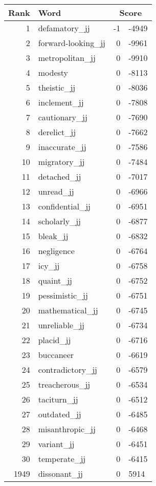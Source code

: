 \begin{longtable}[!htbp]{| rlr@{.}l |}
    \hline
    \textbf{Rank} & \textbf{Word} & \multicolumn{2}{c|}{\textbf{Score}} \\
    \hline
    \endhead
    1 & defamatory\_jj & -1 & -4949 \\
    2 & forward-looking\_jj & 0 & -9961 \\
    3 & metropolitan\_jj & 0 & -9910 \\
    4 & modesty & 0 & -8113 \\
    5 & theistic\_jj & 0 & -8036 \\
    6 & inclement\_jj & 0 & -7808 \\
    7 & cautionary\_jj & 0 & -7690 \\
    8 & derelict\_jj & 0 & -7662 \\
    9 & inaccurate\_jj & 0 & -7586 \\
    10 & migratory\_jj & 0 & -7484 \\
    11 & detached\_jj & 0 & -7017 \\
    12 & unread\_jj & 0 & -6966 \\
    13 & confidential\_jj & 0 & -6951 \\
    14 & scholarly\_jj & 0 & -6877 \\
    15 & bleak\_jj & 0 & -6832 \\
    16 & negligence & 0 & -6764 \\
    17 & icy\_jj & 0 & -6758 \\
    18 & quaint\_jj & 0 & -6752 \\
    19 & pessimistic\_jj & 0 & -6751 \\
    20 & mathematical\_jj & 0 & -6745 \\
    21 & unreliable\_jj & 0 & -6734 \\
    22 & placid\_jj & 0 & -6716 \\
    23 & buccaneer & 0 & -6619 \\
    24 & contradictory\_jj & 0 & -6579 \\
    25 & treacherous\_jj & 0 & -6534 \\
    26 & taciturn\_jj & 0 & -6512 \\
    27 & outdated\_jj & 0 & -6485 \\
    28 & misanthropic\_jj & 0 & -6468 \\
    29 & variant\_jj & 0 & -6451 \\
    30 & temperate\_jj & 0 & -6415 \\
    1949 & dissonant\_jj & 0 & 5914 \\

\end{longtable}
